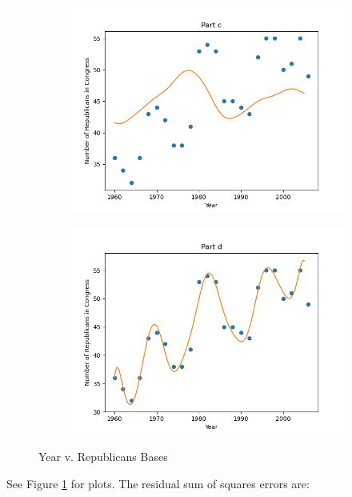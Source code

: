 \documentclass[submit]{harvardml}
\begin{document}
\begin{enumerate}
\begin{figure}[h]
\begin{subfigure}[b]{0.475\textwidth}
			\includegraphics[width=\textwidth]{c}
		\end{subfigure}
		\hfill
		\begin{subfigure}[b]{0.475\textwidth}
			\includegraphics[width=\textwidth]{d}
		\end{subfigure}
		\caption{Year v. Republicans Bases}
		\label{fig:4.1}
	\end{figure}

	See Figure \ref{fig:4.1} for plots. The residual sum of squares errors are:
	

\end{enumerate}
\end{document}
